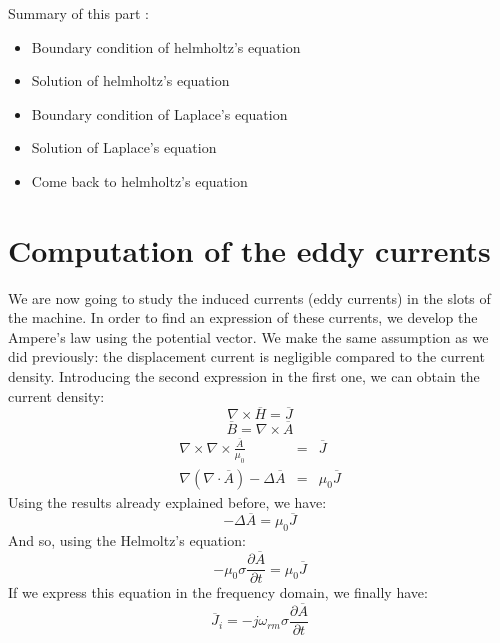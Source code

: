 Summary of this part :
\begin{itemize}
    \item Boundary condition of helmholtz’s equation 
    \item Solution of helmholtz’s equation
    \item Boundary condition of Laplace’s equation
    \item Solution of Laplace’s equation
    \item Come back to helmholtz’s equation
\end{itemize}

\section{Computation of the eddy currents}

We are now going to study the induced currents (eddy currents) in the slots of the machine. In order to find an expression of these currents, we develop the Ampere's law using the potential vector. We make the same assumption as we did previously: the displacement current is negligible compared to the current density. Introducing the second expression in the first one, we can obtain the current density: 
\begin{equation*}
   \nabla \times \overline{H} = \overline{J}
\end{equation*}
\begin{equation*}
    \overline{B} = \nabla \times \overline{A}
\end{equation*}
\begin{eqnarray}
\nabla \times \nabla \times \frac{\overline{A}}{\mu_0} &=& \overline{J}\\
\nabla (\nabla \cdot \overline{A}) - \Delta \overline{A} &=& \mu_0 \overline{J}
\end{eqnarray}
Using the results already explained before, we have: 
\begin{equation*}
    - \Delta \overline{A} = \mu_0 \overline{J}
\end{equation*}
And so, using the Helmoltz's equation: 
\begin{equation*}
    - \mu_0 \sigma\frac{\partial\overline{A}}{\partial t}  = \mu_0 \overline{J}
\end{equation*}
If we express this equation in the frequency domain, we finally have: 
\begin{equation*}
   \overline{J}_i =  - j \omega_{rm}  \sigma\frac{\partial\overline{A}}{\partial t} 
\end{equation*}

